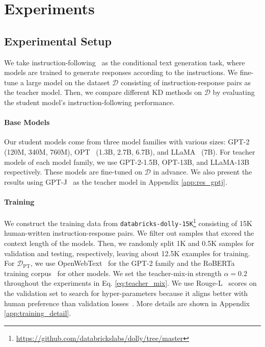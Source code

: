 \documentclass{article}
\begin{document}
\section{Experiments}

\subsection{Experimental Setup}
We take instruction-following~\citep{instruct-gpt} as the conditional text generation task, where models are trained to generate responses according to the instructions. We fine-tune a large model on the dataset $\mathcal{D}$ consisting of instruction-response pairs as the teacher model. Then, we compare different KD methods on $\mathcal{D}$ by evaluating the student model's instruction-following performance.

\paragraph{Base Models} Our student models come from three model families with various sizes: GPT-2~\citep{gpt2} (120M, 340M, 760M), OPT~\citep{opt} (1.3B, 2.7B, 6.7B), and LLaMA~\citep{llama} (7B). For teacher models of each model family, we use GPT-2-1.5B, OPT-13B, and LLaMA-13B respectively. These models are fine-tuned on $\mathcal{D}$ in advance. We also present the results using GPT-J~\citep{gpt-j} as the teacher model in Appendix \ref{app:res_gptj}.

\paragraph{Training} We construct the training data from \texttt{databricks-dolly-15K}\footnote{\url{https://github.com/databrickslabs/dolly/tree/master}} consisting of 15K human-written instruction-response pairs. We filter out samples that exceed the context length of the models. Then, we randomly split 1K and 0.5K samples for validation and testing, respectively, leaving about 12.5K examples for training. For $\mathcal{D}_{\text{PT}}$, we use OpenWebText~\citep{openwebtext} for the GPT-2 family and the RoBERTa training corpus~\citep{roberta} for other models. We set the teacher-mix-in strength $\alpha=0.2$ throughout the experiments in Eq. \ref{eq:teacher_mix}. We use Rouge-L~\citep{rouge} scores on the validation set to search for hyper-parameters because it aligns better with human preference than validation losses~\citep{super-natural-instructions}. More details are shown in Appendix \ref{app:training_detail}.
\end{document}
